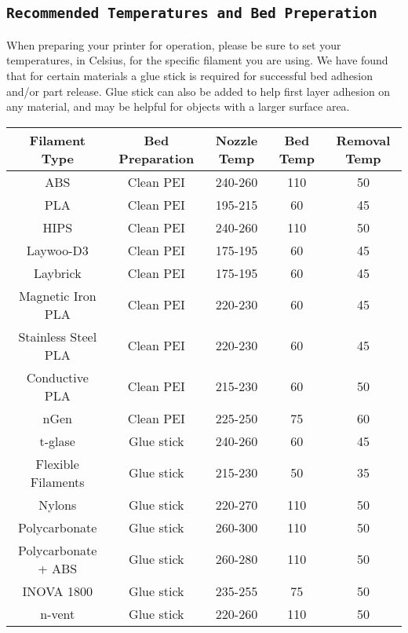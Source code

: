 \subsection{\texttt{Recommended Temperatures and Bed Preperation}}
When preparing your printer for operation, please be sure to set your temperatures, in Celsius, for the specific filament you are using. We have found that for certain materials a glue stick is required for successful bed adhesion and/or part release. Glue stick can also be added to help first layer adhesion on any material, and may be helpful for objects with a larger surface area. 

\begin{center}
 \hspace*{-1.5cm}\begin{tabular}{||c c c c c||} 
 \hline
 Filament Type & Bed Preparation & Nozzle Temp & Bed Temp & Removal Temp \\ [0.5ex] 
 \hline\hline
 ABS & Clean PEI & 240-260 & 110 & 50 \\ 
 \hline
 PLA & Clean PEI & 195-215 & 60 & 45 \\
 \hline
 HIPS & Clean PEI & 240-260 & 110 & 50\\
 \hline
 Laywoo-D3 & Clean PEI & 175-195 & 60 & 45 \\
 \hline
 Laybrick & Clean PEI & 175-195 & 60 & 45 \\
 \hline 
 Magnetic Iron PLA & Clean PEI & 220-230 & 60 & 45 \\
 \hline
 Stainless Steel PLA & Clean PEI & 220-230 & 60 & 45 \\
 \hline
 Conductive PLA & Clean PEI & 215-230 & 60 & 50 \\
 \hline
 nGen & Clean PEI & 225-250 & 75 & 60 \\
 \hline
 t-glase & Glue stick & 240-260 & 60 & 45 \\
 \hline
 Flexible Filaments & Glue stick & 215-230 & 50 & 35 \\  
 \hline
 Nylons & Glue stick & 220-270 & 110 & 50 \\
 \hline
 Polycarbonate & Glue stick & 260-300 & 110 & 50 \\ 
 \hline
 Polycarbonate + ABS & Glue stick & 260-280 & 110 & 50 \\
 \hline
 INOVA 1800 & Glue stick & 235-255 & 75 & 50 \\
 \hline
 n-vent & Glue stick & 220-260 & 110 & 50 \\ [1ex]
 \hline
 
\end{tabular}
\end{center}

